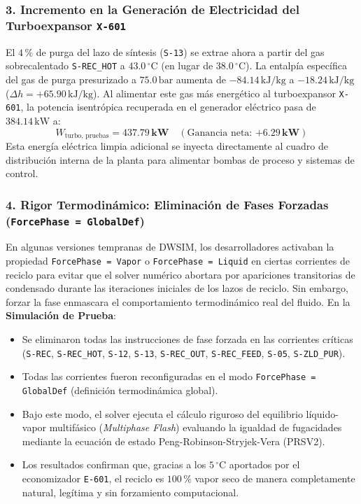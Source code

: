\documentclass[11pt,a4paper]{article}
\begin{document}
\subsubsection{3. Incremento en la Generación de Electricidad del Turboexpansor \texttt{X-601}}
El $4\,\%$ de purga del lazo de síntesis (\texttt{S-13}) se extrae ahora a partir del gas sobrecalentado \texttt{S-REC\_HOT} a $43.0\,^\circ\text{C}$ (en lugar de $38.0\,^\circ\text{C}$).
La entalpía específica del gas de purga presurizado a $75.0\,\text{bar}$ aumenta de $-84.14\,\text{kJ/kg}$ a $-18.24\,\text{kJ/kg}$ ($\Delta h = +65.90\,\text{kJ/kg}$).
Al alimentar este gas más energético al turboexpansor \texttt{X-601}, la potencia isentrópica recuperada en el generador eléctrico pasa de $384.14\,\text{kW}$ a:
\begin{equation}
    W_{\text{turbo, pruebas}} = \mathbf{437.79\,\text{kW}} \quad (\text{Ganancia neta: } \mathbf{+6.29\,\text{kW}})
\end{equation}
Esta energía eléctrica limpia adicional se inyecta directamente al cuadro de distribución interna de la planta para alimentar bombas de proceso y sistemas de control.

\subsubsection{4. Rigor Termodinámico: Eliminación de Fases Forzadas (\texttt{ForcePhase = GlobalDef})}
En algunas versiones tempranas de DWSIM, los desarrolladores activaban la propiedad \texttt{ForcePhase = Vapor} o \texttt{ForcePhase = Liquid} en ciertas corrientes de reciclo para evitar que el solver numérico abortara por apariciones transitorias de condensado durante las iteraciones iniciales de los lazos de reciclo.
Sin embargo, forzar la fase enmascara el comportamiento termodinámico real del fluido. En la \textbf{Simulación de Prueba}:
\begin{itemize}
    \item Se eliminaron todas las instrucciones de fase forzada en las corrientes críticas (\texttt{S-REC}, \texttt{S-REC\_HOT}, \texttt{S-12}, \texttt{S-13}, \texttt{S-REC\_OUT}, \texttt{S-REC\_FEED}, \texttt{S-05}, \texttt{S-ZLD\_PUR}).
    \item Todas las corrientes fueron reconfiguradas en el modo \texttt{ForcePhase = GlobalDef} (definición termodinámica global).
    \item Bajo este modo, el solver ejecuta el cálculo riguroso del equilibrio líquido-vapor multifásico (\textit{Multiphase Flash}) evaluando la igualdad de fugacidades mediante la ecuación de estado Peng-Robinson-Stryjek-Vera (PRSV2).
    \item Los resultados confirman que, gracias a los $5\,^\circ\text{C}$ aportados por el economizador \texttt{E-601}, el reciclo es $100\,\%$ vapor seco de manera completamente natural, legítima y sin forzamiento computacional.
\end{itemize}
\end{document}
